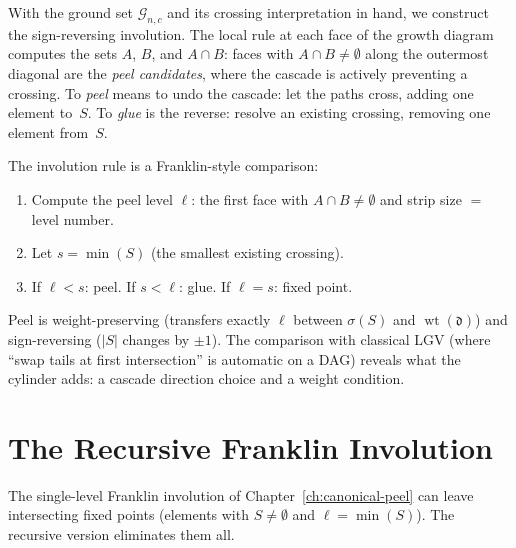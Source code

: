 \documentclass[11pt]{report}
\DeclareMathOperator{\wt}{wt}
\theoremstyle{plain}
\theoremstyle{definition}
\begin{document}
With the ground set $\mathcal{G}_{n,c}$ and its crossing
interpretation in hand, we construct the sign-reversing
involution.  The local rule at each face of the growth
diagram computes the sets $A$, $B$, and $A \cap B$: faces
with $A \cap B \neq \emptyset$ along the outermost
diagonal are the \emph{peel candidates}, where the
cascade is actively preventing a crossing.  To \emph{peel}
means to undo the cascade: let the paths cross, adding
one element to~$S$.  To \emph{glue} is the reverse:
resolve an existing crossing, removing one element
from~$S$.

The involution rule is a Franklin-style comparison:
\begin{enumerate}
  \item Compute the peel level $\ell$: the first face
    with $A \cap B \neq \emptyset$ and strip size
    $= $ level number.
  \item Let $s = \min(S)$ (the smallest existing crossing).
  \item If $\ell < s$: peel.  If $s < \ell$: glue.
    If $\ell = s$: fixed point.
\end{enumerate}

Peel is weight-preserving (transfers exactly $\ell$
between $\sigma(S)$ and $\wt(\mathfrak{d})$) and
sign-reversing ($|S|$ changes by $\pm 1$).  The comparison
with classical LGV (where ``swap tails at first
intersection'' is automatic on a DAG) reveals what the
cylinder adds: a cascade direction choice and a weight
condition.




\chapter{The Recursive Franklin Involution}
\label{ch:involution}

The single-level Franklin involution of
Chapter~\ref{ch:canonical-peel} can leave intersecting
fixed points (elements with $S \neq \emptyset$ and
$\ell = \min(S)$).  The recursive version eliminates
them all.
\end{document}
